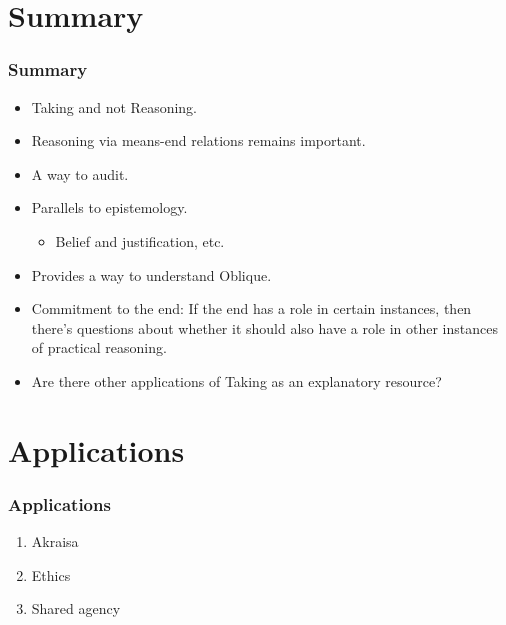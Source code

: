 \documentclass[noamssymb,
graphics,
]{beamer} %
\newcommand{\schemaName}[1]{\textsf{#1}}
\begin{document}
\section{Summary}
\label{sec:summary}


\begin{frame}
  \frametitle{Summary}

  \begin{itemize}
  \item \schemaName{Taking} and not \schemaName{Reasoning}.
  \item Reasoning via means-end relations remains important.
  \item A way to audit.
  \item Parallels to epistemology.
    \begin{itemize}
    \item Belief and justification, etc.
    \end{itemize}
  \item Provides a way to understand Oblique.
  \item Commitment to the end: If the end has a role in certain instances, then there's questions about whether it should also have a role in other instances of practical reasoning.
  \item Are there other applications of Taking as an explanatory resource?
  \end{itemize}

\end{frame}

\section{Applications}
\label{sec:future-work}

\begin{frame}
  \frametitle{Applications}

  \begin{enumerate}
  \item Akraisa
  \item Ethics
  \item Shared agency
  \end{enumerate}
\end{frame}
\end{document}
